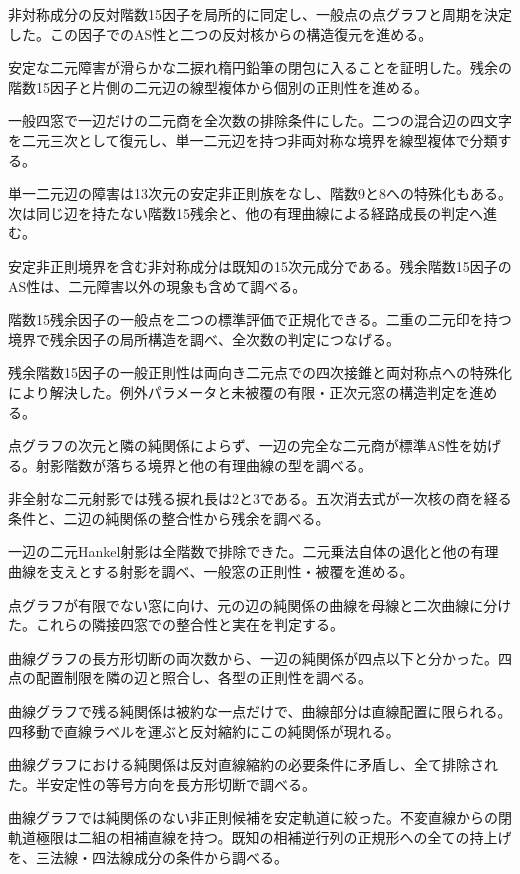 \documentclass[11pt,a4paper]{ltjsarticle}
\begin{document}
非対称成分の反対階数15因子を局所的に同定し、一般点の点グラフと周期を決定した。この因子でのAS性と二つの反対核からの構造復元を進める。

安定な二元障害が滑らかな二捩れ楕円鉛筆の閉包に入ることを証明した。残余の階数15因子と片側の二元辺の線型複体から個別の正則性を進める。

一般四窓で一辺だけの二元商を全次数の排除条件にした。二つの混合辺の四文字を二元三次として復元し、単一二元辺を持つ非両対称な境界を線型複体で分類する。

単一二元辺の障害は13次元の安定非正則族をなし、階数9と8への特殊化もある。次は同じ辺を持たない階数15残余と、他の有理曲線による経路成長の判定へ進む。

安定非正則境界を含む非対称成分は既知の15次元成分である。残余階数15因子のAS性は、二元障害以外の現象も含めて調べる。

階数15残余因子の一般点を二つの標準評価で正規化できる。二重の二元印を持つ境界で残余因子の局所構造を調べ、全次数の判定につなげる。

残余階数15因子の一般正則性は両向き二元点での四次接錐と両対称点への特殊化により解決した。例外パラメータと未被覆の有限・正次元窓の構造判定を進める。

点グラフの次元と隣の純関係によらず、一辺の完全な二元商が標準AS性を妨げる。射影階数が落ちる境界と他の有理曲線の型を調べる。

非全射な二元射影では残る捩れ長は2と3である。五次消去式が一次核の商を経る条件と、二辺の純関係の整合性から残余を調べる。

一辺の二元Hankel射影は全階数で排除できた。二元乗法自体の退化と他の有理曲線を支えとする射影を調べ、一般窓の正則性・被覆を進める。

点グラフが有限でない窓に向け、元の辺の純関係の曲線を母線と二次曲線に分けた。これらの隣接四窓での整合性と実在を判定する。

曲線グラフの長方形切断の両次数から、一辺の純関係が四点以下と分かった。四点の配置制限を隣の辺と照合し、各型の正則性を調べる。

曲線グラフで残る純関係は被約な一点だけで、曲線部分は直線配置に限られる。四移動で直線ラベルを運ぶと反対縮約にこの純関係が現れる。

曲線グラフにおける純関係は反対直線縮約の必要条件に矛盾し、全て排除された。半安定性の等号方向を長方形切断で調べる。

曲線グラフでは純関係のない非正則候補を安定軌道に絞った。不変直線からの閉軌道極限は二組の相補直線を持つ。既知の相補逆行列の正規形への全ての持上げを、三法線・四法線成分の条件から調べる。
\end{document}
